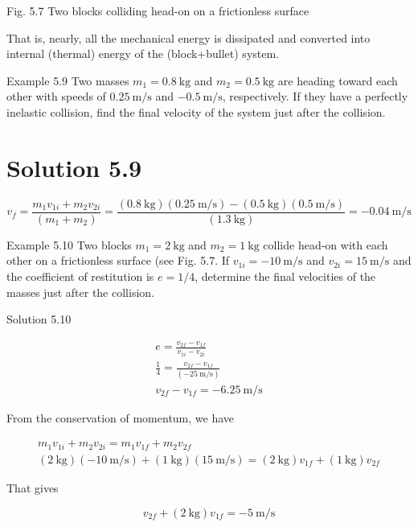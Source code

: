 \documentclass[10pt]{article}
\begin{document}
Fig. 5.7 Two blocks colliding head-on on a frictionless surface

That is, nearly, all the mechanical energy is dissipated and converted into internal (thermal) energy of the (block+bullet) system.

Example 5.9 Two masses $m_{1}=0.8 \mathrm{~kg}$ and $m_{2}=0.5 \mathrm{~kg}$ are heading toward each other with speeds of $0.25 \mathrm{~m} / \mathrm{s}$ and $-0.5 \mathrm{~m} / \mathrm{s}$, respectively. If they have a perfectly inelastic collision, find the final velocity of the system just after the collision.

\section*{Solution 5.9}
$$
v_{f}=\frac{m_{1} v_{1 i}+m_{2} v_{2 i}}{\left(m_{1}+m_{2}\right)}=\frac{(0.8 \mathrm{~kg})(0.25 \mathrm{~m} / \mathrm{s})-(0.5 \mathrm{~kg})(0.5 \mathrm{~m} / \mathrm{s})}{(1.3 \mathrm{~kg})}=-0.04 \mathrm{~m} / \mathrm{s}
$$

Example 5.10 Two blocks $m_{1}=2 \mathrm{~kg}$ and $m_{2}=1 \mathrm{~kg}$ collide head-on with each other on a frictionless surface (see Fig. 5.7. If $v_{1 i}=-10 \mathrm{~m} / \mathrm{s}$ and $v_{2 i}=15 \mathrm{~m} / \mathrm{s}$ and the coefficient of restitution is $e=1 / 4$, determine the final velocities of the masses just after the collision.

Solution 5.10


\begin{gather*}
e=\frac{v_{2 f}-v_{1 f}}{v_{1 i}-v_{2 i}} \\
\frac{1}{4}=\frac{v_{2 f}-v_{1 f}}{(-25 \mathrm{~m} / \mathrm{s})} \\
v_{2 f}-v_{1 f}=-6.25 \mathrm{~m} / \mathrm{s} \tag{5.6}
\end{gather*}


From the conservation of momentum, we have

$$
\begin{gathered}
m_{1} v_{1 i}+m_{2} v_{2 i}=m_{1} v_{1 f}+m_{2} v_{2 f} \\
(2 \mathrm{~kg})(-10 \mathrm{~m} / \mathrm{s})+(1 \mathrm{~kg})(15 \mathrm{~m} / \mathrm{s})=(2 \mathrm{~kg}) v_{1 f}+(1 \mathrm{~kg}) v_{2 f}
\end{gathered}
$$

That gives


\begin{equation*}
v_{2 f}+(2 \mathrm{~kg}) v_{1 f}=-5 \mathrm{~m} / \mathrm{s} \tag{5.7}
\end{equation*}
\end{document}
